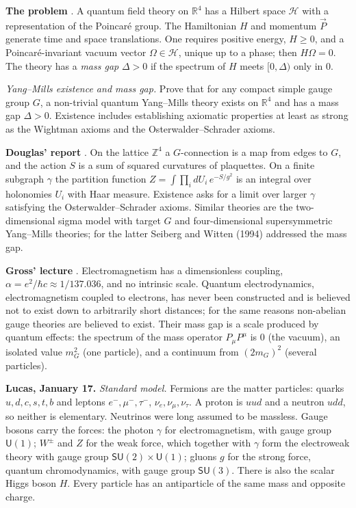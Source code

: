 \medskip\noindent
{\bf The problem} \cite{yangmills}. A
quantum field theory on $\mathbb{R}^4$ has a
Hilbert space $\mathcal{H}$ with a
representation of the Poincar\'e group. The
Hamiltonian $H$ and momentum $\vec{P}$
generate time and space translations. One
requires positive energy, $H\geq 0$, and a
Poincar\'e-invariant vacuum vector
$\Omega\in\mathcal{H}$, unique up to a
phase; then $H\Omega=0$. The theory has a
{\it mass gap} $\Delta>0$ if the spectrum of
$H$ meets $[0,\Delta)$ only in $0$.

{\it Yang--Mills existence and mass gap.}
Prove that for any compact simple gauge
group $G$, a non-trivial quantum Yang--Mills
theory exists on $\mathbb{R}^4$ and has a
mass gap $\Delta>0$. Existence includes
establishing axiomatic properties at least
as strong as the Wightman axioms and the
Osterwalder--Schrader axioms.

\medskip\noindent
{\bf Douglas' report} \cite{reportdouglas}.
On the lattice $\mathbb{Z}^4$ a
$G$-connection is a map from edges to $G$,
and the action $S$ is a sum of squared
curvatures of plaquettes. On a finite
subgraph $\gamma$ the partition function
$Z=\int\prod_i dU_i\, e^{-S/g^2}$ is an
integral over holonomies $U_i$ with Haar
measure. Existence asks for a limit over
larger $\gamma$ satisfying the
Osterwalder--Schrader axioms. Similar
theories are the two-dimensional sigma
model with target $G$ and four-dimensional
supersymmetric Yang--Mills theories; for
the latter Seiberg and Witten (1994)
addressed the mass gap.

\medskip\noindent
{\bf Gross' lecture} \cite{gross-video}.
Electromagnetism has a dimensionless
coupling, $\alpha=e^2/\hbar c\approx
1/137.036$, and no intrinsic scale. Quantum
electrodynamics, electromagnetism coupled
to electrons, has never been constructed
and is believed not to exist down to
arbitrarily short distances; for the same
reasons non-abelian gauge theories are
believed to exist. Their mass gap is a
scale produced by quantum effects: the
spectrum of the mass operator
$P_\mu P^\mu$ is $0$ (the vacuum), an
isolated value $m_G^2$ (one particle), and
a continuum from $(2m_G)^2$ (several
particles).

\medskip\noindent
{\bf Lucas, January 17.} {\it Standard
model.} Fermions are the matter particles:
quarks $u,d,c,s,t,b$ and
leptons $e^-,\mu^-,\tau^-$,
$\nu_e,\nu_\mu,\nu_\tau$. A proton is $uud$
and a neutron $udd$, so neither is
elementary. Neutrinos were long assumed to
be massless. Gauge bosons carry the forces:
the photon $\gamma$ for electromagnetism,
with gauge group $\mathsf{U}(1)$; $W^\pm$
and $Z$ for the weak force, which together
with $\gamma$ form the electroweak theory
with gauge group
$\mathsf{SU}(2)\times\mathsf{U}(1)$; gluons
$g$ for the strong force, quantum
chromodynamics, with gauge group
$\mathsf{SU}(3)$. There is also the scalar
Higgs boson $H$. Every particle has an
antiparticle of the same mass and opposite
charge.

